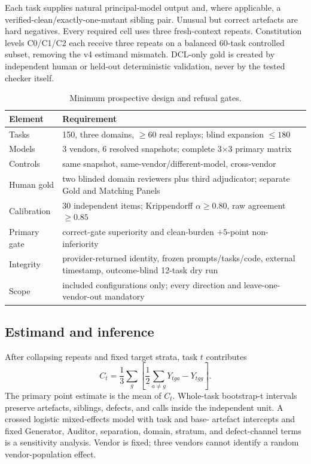 \documentclass[10pt]{article}
\begin{document}
Each task supplies natural principal-model output and, where applicable, a
verified-clean/exactly-one-mutant sibling pair. Unusual but correct artefacts
are hard negatives. Every required cell uses three fresh-context repeats.
Constitution levels C0/C1/C2 each receive three repeats on a balanced 60-task
controlled subset, removing the v4 estimand mismatch. DCL-only gold is created
by independent human or held-out deterministic validation, never by the tested
checker itself.

\begin{table}[t]
\centering\small\setlength{\tabcolsep}{4pt}
\caption{Minimum prospective design and refusal gates.}
\label{tab:design}
\begin{tabular}{@{}p{31mm}p{88mm}@{}}
\toprule
Element & Requirement \\
\midrule
Tasks & 150, three domains, $\geq60$ real replays; blind expansion $\leq180$ \\
Models & 3 vendors, 6 resolved snapshots; complete 3$\times$3 primary matrix \\
Controls & same snapshot, same-vendor/different-model, cross-vendor \\
Human gold & two blinded domain reviewers plus third adjudicator; separate Gold and Matching Panels \\
Calibration & 30 independent items; Krippendorff $\alpha\geq0.80$, raw agreement $\geq0.85$ \\
Primary gate & correct-gate superiority and clean-burden $+5$-point non-inferiority \\
Integrity & provider-returned identity, frozen prompts/tasks/code, external timestamp, outcome-blind 12-task dry run \\
Scope & included configurations only; every direction and leave-one-vendor-out mandatory \\
\bottomrule
\end{tabular}
\end{table}

\subsection{Estimand and inference}

After collapsing repeats and fixed target strata, task $t$ contributes
\begin{equation}
C_t=\frac{1}{3}\sum_g\left[\frac{1}{2}\sum_{a\ne g}Y_{tga}-Y_{tgg}\right].
\end{equation}
The primary point estimate is the mean of $C_t$. Whole-task bootstrap-t
intervals preserve artefacts, siblings, defects, and calls inside the
independent unit. A crossed logistic mixed-effects model with task and base-
artefact intercepts and fixed Generator, Auditor, separation, domain, stratum,
and defect-channel terms is a sensitivity analysis. Vendor is fixed; three
vendors cannot identify a random vendor-population effect.
\end{document}
